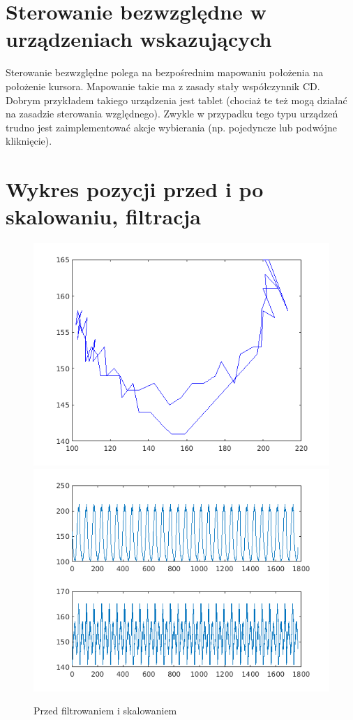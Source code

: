 \documentclass[a4paper, 12pt, titlepage]{article}
\begin{document}
    \section{Sterowanie bezwzględne w urządzeniach wskazujących}
        Sterowanie bezwzględne polega na bezpośrednim mapowaniu 
        położenia na położenie kursora. Mapowanie takie ma z zasady
        stały współczynnik CD. Dobrym przykładem takiego urządzenia
        jest tablet (chociaż te też mogą działać na zasadzie sterowania
        względnego). Zwykle w przypadku tego typu urządzeń trudno jest
        zaimplementować akcje wybierania (np. pojedyncze lub podwójne
        kliknięcie).
    \section{Wykres pozycji przed i po skalowaniu, filtracja}
        \begin{figure}[H]
            \centering
            \includegraphics[width=0.8\linewidth]{single_plot.png}
            \includegraphics[width=0.8\linewidth]{two_plot.png}
            \caption{Przed filtrowaniem i skalowaniem}
        \end{figure}
\end{document}
